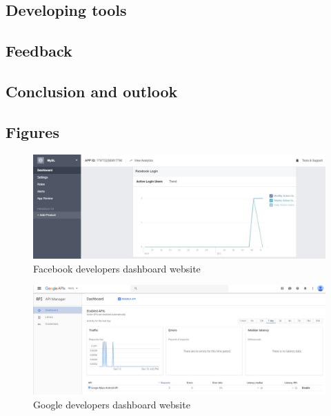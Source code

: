 \documentclass[11pt,twoside,a4paper]{report}
\begin{document}
\section{Developing tools}

\section{Feedback}

\section{Conclusion and outlook}

\begin{appendices}

\chapter{Figures}
\label{appendix}

\thispagestyle{empty}

\newpage

\begin{figure}
	\centering
	\includegraphics[width=1\textwidth]{jpg/facebook-developers.jpg}
	\caption{Facebook developers dashboard website}
	\label{figure:start-view}
\end{figure}

\begin{figure}
	\centering
	\includegraphics[width=1\textwidth]{jpg/google-developers.jpg}
	\caption{Google developers dashboard website}
	\label{figure:navigation-drawer-in-start-view}
\end{figure}


\end{appendices}
\end{document}
